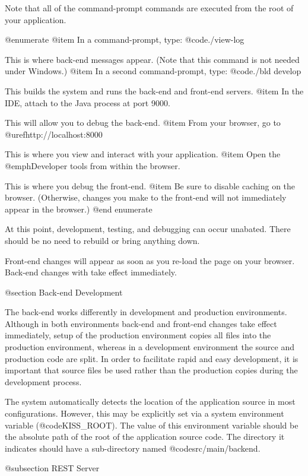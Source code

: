 Note that all of the command-prompt commands are executed from the
root of your application.

@enumerate
@item
In a command-prompt, type:  @code{./view-log}

This is where back-end messages appear. (Note that this command is not needed under Windows.)
@item
In a second command-prompt, type:  @code{./bld develop}

This builds the system and runs the back-end and front-end servers.
@item
In the IDE, attach to the Java process at port 9000.

This will allow you to debug the back-end.
@item
From your browser, go to @uref{http://localhost:8000}

This is where you view and interact with your application.
@item
Open the @emph{Developer tools} from within the browser.

This is where you debug the front-end.
@item
Be sure to disable caching on the browser. (Otherwise, changes you make to 
the front-end will not immediately appear in the browser.)
@end enumerate

At this point, development, testing, and debugging can occur unabated.
There should be no need to rebuild or bring anything down.

Front-end changes will appear as soon as you re-load the page on your browser.
Back-end changes with take effect immediately.

@section Back-end Development

The back-end works differently in development and production
environments.  Although in both environments back-end and front-end
changes take effect immediately, setup of the production environment
copies all files into the production environment, whereas in a
development environment the source and production code are split.  In
order to facilitate rapid and easy development, it is important that
source files be used rather than the production copies during the
development process.  

The system automatically detects the location of the application
source in most configurations.  However, this may be explicitly
set via a system environment variable (@code{KISS_ROOT}).  The
value of this environment variable should be the absolute path of the
root of the application source code.  The directory it indicates
should have a sub-directory named @code{src/main/backend}.



@subsection REST Server

